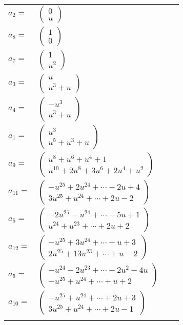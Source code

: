 \documentclass[1p]{elsarticle_modified}
\theoremstyle{definition}
\begin{document}
\begin{tabular}{m{7pt} m{180pt} m{7pt} m{180pt} }
\flushright $a_{2}=$&$\begin{pmatrix}0\\u\end{pmatrix}$ \\
\flushright $a_{8}=$&$\begin{pmatrix}1\\0\end{pmatrix}$ \\
\flushright $a_{7}=$&$\begin{pmatrix}1\\u^2\end{pmatrix}$ \\
\flushright $a_{3}=$&$\begin{pmatrix}u\\u^3+u\end{pmatrix}$ \\
\flushright $a_{4}=$&$\begin{pmatrix}- u^3\\u^3+u\end{pmatrix}$ \\
\flushright $a_{1}=$&$\begin{pmatrix}u^3\\u^5+u^3+u\end{pmatrix}$ \\
\flushright $a_{9}=$&$\begin{pmatrix}u^8+u^6+u^4+1\\u^{10}+2 u^8+3 u^6+2 u^4+u^2\end{pmatrix}$ \\
\flushright $a_{11}=$&$\begin{pmatrix}- u^{25}+2 u^{24}+\cdots+2 u+4\\3 u^{25}+u^{24}+\cdots+2 u-2\end{pmatrix}$ \\
\flushright $a_{6}=$&$\begin{pmatrix}-2 u^{25}- u^{24}+\cdots-5 u+1\\u^{24}+u^{23}+\cdots+2 u+2\end{pmatrix}$ \\
\flushright $a_{12}=$&$\begin{pmatrix}- u^{25}+3 u^{24}+\cdots+u+3\\2 u^{25}+13 u^{23}+\cdots+u-2\end{pmatrix}$ \\
\flushright $a_{5}=$&$\begin{pmatrix}- u^{24}-2 u^{23}+\cdots-2 u^2-4 u\\- u^{25}+u^{24}+\cdots+u+2\end{pmatrix}$ \\
\flushright $a_{10}=$&$\begin{pmatrix}- u^{25}+u^{24}+\cdots+2 u+3\\3 u^{25}+u^{24}+\cdots+2 u-1\end{pmatrix}$\\&\end{tabular}
\end{document}
